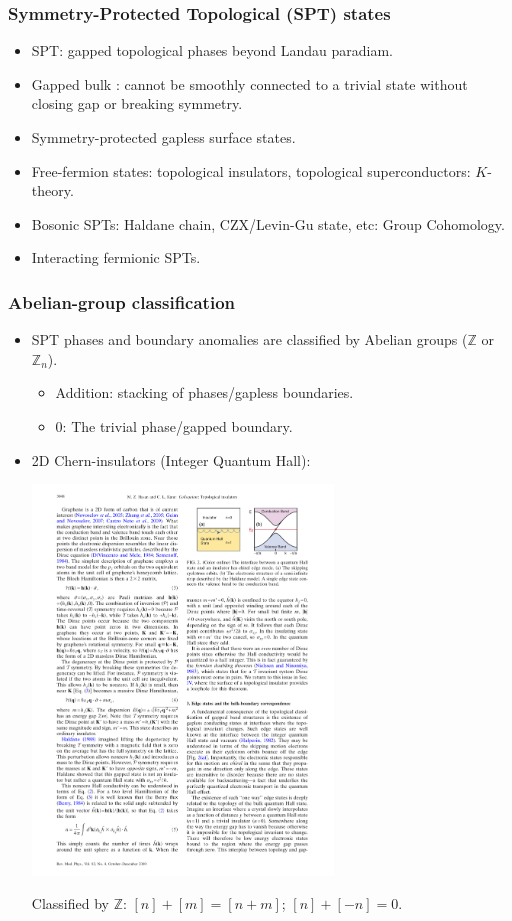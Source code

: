 \documentclass[xcolor=table, 11pt, aspectratio=43]{beamer}
\begin{document}
\begin{frame}
  \frametitle{Symmetry-Protected Topological (SPT) states}
\begin{itemize}
\item SPT: gapped topological phases beyond Landau paradiam.
\item Gapped bulk : cannot be smoothly connected to a trivial state without closing gap or breaking symmetry.
\item Symmetry-protected gapless surface states.
\item Free-fermion states: topological insulators, topological superconductors: $K$-theory.
\item Bosonic SPTs: Haldane chain, CZX/Levin-Gu state, etc: Group Cohomology.
\item Interacting fermionic SPTs.
\end{itemize}
\end{frame}

\begin{frame}
	\frametitle{Abelian-group classification}
	\begin{itemize}
		\item SPT phases and boundary anomalies are classified by Abelian groups ($\mathbb Z$ or $\mathbb Z_n$).
		\begin{itemize}
			\item Addition: stacking of phases/gapless boundaries.
			\item 0: The trivial phase/gapped boundary.
		\end{itemize}
		\item 2D Chern-insulators (Integer Quantum Hall):
		\begin{center}
				\includegraphics[width=8cm]{qhe_edge}
		\end{center}
		Classified by $\mathbb Z$: $[n]+[m]=[n+m]$; $[n]+[-n] = 0$.
	\end{itemize}
\end{frame}
\end{document}
